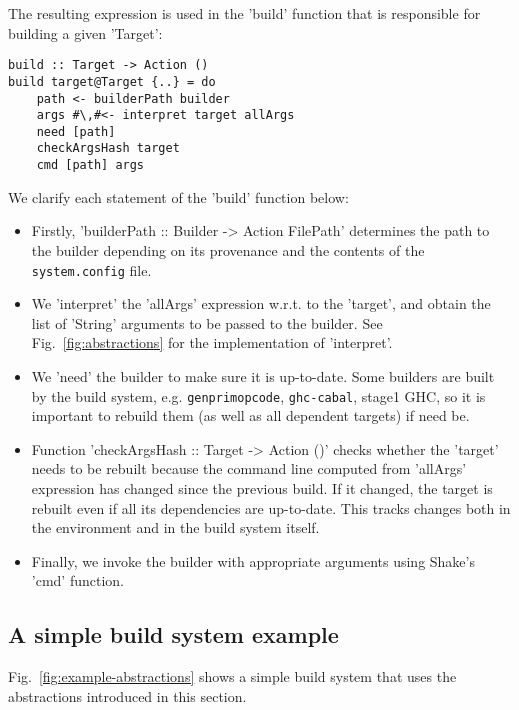 The resulting expression is used in the \lst'build' function that is responsible
for building a given \lst'Target':

\begin{lstlisting}
build :: Target -> Action ()
build target@Target {..} = do
    path <- builderPath builder
    args #\,#<- interpret target allArgs
    need [path]
    checkArgsHash target
    cmd [path] args
\end{lstlisting}

\noindent We clarify each statement of the \lst'build' function below:
\begin{itemize}
  \item Firstly, \lst'builderPath :: Builder -> Action FilePath' determines the
  path to the builder depending on its provenance and the contents of the
  \texttt{system.config} file.
  \item We \lst'interpret' the \lst'allArgs' expression w.r.t. to the
  \lst'target', and obtain the list of \lst'String' arguments to be passed to
  the builder. See Fig.~\ref{fig:abstractions} for the implementation of
  \lst'interpret'.
  \item We \lst'need' the builder to make sure it is up-to-date. Some builders
  are built by the build system, e.g. \texttt{genprimopcode},
  \texttt{ghc-cabal}, stage1 GHC, so it is important to rebuild them (as well as
  all dependent targets) if need be.
  \item Function \lst'checkArgsHash :: Target -> Action ()' checks whether the
  \lst'target' needs to be rebuilt because the command line computed from
  \lst'allArgs' expression has changed since the previous build. If it changed,
  the target is rebuilt even if all its dependencies are up-to-date. This tracks
  changes both in the environment and in the build system itself. 
  \item Finally, we invoke the builder with appropriate arguments using Shake's
  \lst'cmd' function.
\end{itemize}

\subsection{A simple build system example}

Fig.~\ref{fig:example-abstractions} shows a simple build system that uses the
abstractions introduced in this section.

\newcommand{\tabx}[1]{\hspace{.106\textwidth}\rlap{#1}}
\newcommand{\taby}[1]{\hspace{.103\textwidth}\rlap{#1}}
\newcommand{\tabz}[1]{\hspace{.24\textwidth}\rlap{#1}}


